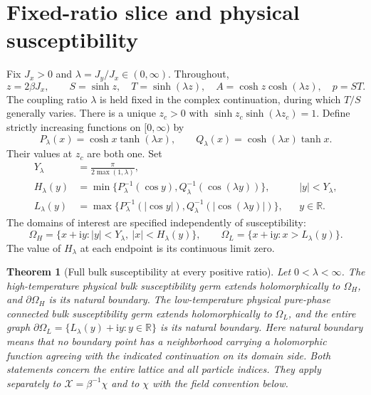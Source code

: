 \documentclass[11pt]{article}
\numberwithin{equation}{section}
\newtheorem{theorem}{Theorem}[section]
\theoremstyle{definition}
\newcommand{\R}{\mathbb R}
\newcommand{\ii}{\mathrm i}
\newcommand{\OH}{\Omega_H}
\newcommand{\OL}{\Omega_L}
\begin{document}
\tableofcontents

\section{Fixed-ratio slice and physical susceptibility}\label{sec:physical}

Fix $J_x>0$ and $\lambda=J_y/J_x\in(0,\infty)$. Throughout,
\begin{equation}\label{eq:variables}
 z=2\beta J_x,\qquad S=\sinh z,\quad T=\sinh(\lambda z),\quad
 A=\cosh z\cosh(\lambda z),\quad p=ST.
\end{equation}
The coupling ratio $\lambda$ is held fixed in the complex continuation,
during which $T/S$ generally varies.
There is a unique $z_c>0$ with $\sinh z_c\sinh(\lambda z_c)=1$.
Define strictly increasing functions on $[0,\infty)$ by
\begin{equation}\label{eq:physicalPQ}
 P_\lambda(x)=\cosh x\tanh(\lambda x),\qquad
 Q_\lambda(x)=\cosh(\lambda x)\tanh x.
\end{equation}
Their values at $z_c$ are both one. Set
\begin{align}
 Y_\lambda&=\frac{\pi}{2\max(1,\lambda)},\nonumber\\
 H_\lambda(y)&=\min\{P_\lambda^{-1}(\cos y),
                      Q_\lambda^{-1}(\cos(\lambda y))\},
                      &&|y|<Y_\lambda,\label{eq:Hdef}\\
 L_\lambda(y)&=\max\{P_\lambda^{-1}(|\cos y|),
                      Q_\lambda^{-1}(|\cos(\lambda y)|)\},
                      &&y\in\R.\label{eq:Ldef}
\end{align}
The domains of interest are specified independently of susceptibility:
\begin{equation}\label{eq:domains}
 \OH=\{x+\ii y:|y|<Y_\lambda,\ |x|<H_\lambda(y)\},\qquad
 \OL=\{x+\ii y:x>L_\lambda(y)\}.
\end{equation}
The value of $H_\lambda$ at each endpoint is its continuous limit zero.

\begin{theorem}[Full bulk susceptibility at every positive ratio]\label{thm:aniso}
Let $0<\lambda<\infty$. The high-temperature physical
bulk susceptibility germ extends holomorphically to $\OH$, and
$\partial\OH$ is its natural boundary. The low-temperature physical
pure-phase connected bulk susceptibility germ extends holomorphically to
$\OL$, and the entire graph $\partial\OL=\{L_\lambda(y)+\ii y:y\in\R\}$
is its natural boundary. Here natural boundary means that no boundary
point has a neighborhood carrying a holomorphic function agreeing with
the indicated continuation on its domain side. Both statements concern
the entire lattice and all particle indices. They apply separately to
$\mathcal X=\beta^{-1}\chi$ and to $\chi$ with the field convention below.
\end{theorem}
\end{document}
